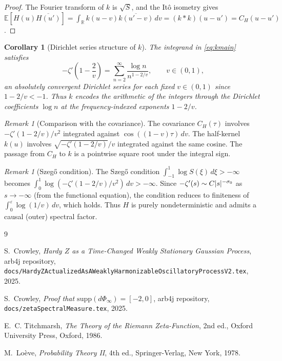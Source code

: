 \documentclass[11pt,reqno]{amsart}
\newtheorem{corollary}[theorem]{Corollary}
\theoremstyle{definition}
\theoremstyle{remark}
\newtheorem{remark}[theorem]{Remark}
\DeclarePairedDelimiter{\abs}{\lvert}{\rvert}
\begin{document}
\begin{proof}
The Fourier transform of \(k\) is \(\sqrt{S}\), and the
It\^o isometry gives
\(\mathbb{E}[H(u)\overline{H(u')}] = \int_{\mathbb{R}}k(u-v)\overline{k(u'-v)}\,dv
= (k*k)(u-u') = C_H(u-u')\).
\end{proof}

\begin{corollary}[Dirichlet series structure of \(k\)]\label{cor:Dirichlet}
The integrand in \eqref{eq:kmain} satisfies
\[
  -\zeta'\!\!\left(1-\frac{2}{v}\right)
  = \sum_{n=2}^{\infty}\frac{\log n}{n^{1-2/v}},
  \qquad v \in (0,1),
\]
an absolutely convergent Dirichlet series for each fixed \(v \in
(0,1)\) since \(1-2/v < -1\). Thus \(k\) encodes the arithmetic
of the integers through the Dirichlet coefficients \(\log n\) at the
frequency-indexed exponents \(1-2/v\).
\end{corollary}

\begin{remark}[Comparison with the covariance]
The covariance \(C_H(\tau)\) involves
\(-\zeta'(1-2/v)/v^2\) integrated against \(\cos((1-v)\tau)\,dv\).
The half-kernel \(k(u)\) involves \(\sqrt{-\zeta'(1-2/v)}/v\)
integrated against the same cosine. The passage from \(C_H\) to \(k\)
is a pointwise square root under the integral sign.
\end{remark}

\begin{remark}[Szeg\H{o} condition]
The Szeg\H{o} condition \(\int_{-1}^1 \log S(\xi)\,d\xi > -\infty\)
becomes \(\int_0^1 \log(-\zeta'(1-2/v)/v^2)\,dv > -\infty\). Since
\(-\zeta'(s) \sim C\abs{s}^{-\sigma_0}\) as \(s\to-\infty\) (from the
functional equation), the condition reduces to finiteness of
\(\int_0^{\varepsilon}\log(1/v)\,dv\), which holds. Thus \(H\) is
purely nondeterministic and admits a causal (outer) spectral factor.
\end{remark}

\begin{thebibliography}{9}

S.~Crowley,
\emph{Hardy $Z$ as a Time-Changed Weakly Stationary Gaussian Process},
arb4j repository, \texttt{docs/HardyZActualizedAsAWeaklyHarmonizableOscillatoryProcessV2.tex},
2025.

S.~Crowley,
\emph{Proof that $\mathrm{supp}(d\Phi_\infty) = [-2,0]$},
arb4j repository, \texttt{docs/zetaSpectralMeasure.tex},
2025.

E.~C. Titchmarsh,
\emph{The Theory of the Riemann Zeta-Function},
2nd ed., Oxford University Press, Oxford, 1986.

M.~Lo\`eve,
\emph{Probability Theory II},
4th ed., Springer-Verlag, New York, 1978.

\end{thebibliography}
\end{document}
